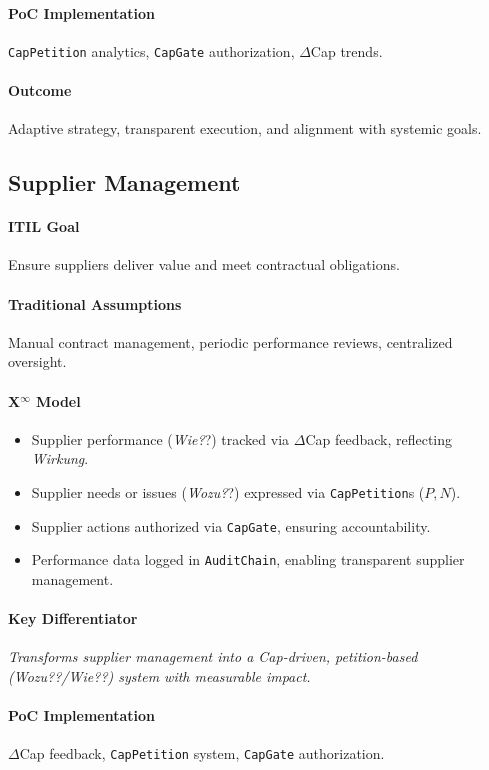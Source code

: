 \documentclass[12pt, a4paper]{scrartcl}
\newcommand{\Xinf}{X$^\infty$}                        %
\newcommand{\DeltaCap}{$\Delta$Cap}                    %
\newcommand{\Wirkung}{\textit{Wirkung}}                 %
\newcommand{\CapGate}{\texttt{CapGate}}
\newcommand{\AuditChain}{\texttt{AuditChain}}
\newcommand{\CapPetition}{\texttt{CapPetition}}        %
\newcommand{\Wozu}{\textit{Wozu?}}                      %
\newcommand{\Wie}{\textit{Wie?}}                        %
\begin{document}
\paragraph{PoC Implementation} \CapPetition{} analytics, \CapGate{} authorization, \DeltaCap{} trends.
\paragraph{Outcome} Adaptive strategy, transparent execution, and alignment with systemic goals.

\subsection{Supplier Management} %
\paragraph{ITIL Goal} Ensure suppliers deliver value and meet contractual obligations.
\paragraph{Traditional Assumptions} Manual contract management, periodic performance reviews, centralized oversight.
\paragraph*{\Xinf{} Model}
\begin{itemize}
    \item Supplier performance (\Wie?) tracked via \DeltaCap{} feedback, reflecting \Wirkung{}.
    \item Supplier needs or issues (\Wozu?) expressed via \CapPetition{}s ($P, N$).
    \item Supplier actions authorized via \CapGate{}, ensuring accountability.
    \item Performance data logged in \AuditChain{}, enabling transparent supplier management.
\end{itemize}
\paragraph{Key Differentiator} \textit{Transforms supplier management into a Cap-driven, petition-based (\Wozu?/\Wie?) system with measurable impact.}
\paragraph{PoC Implementation} \DeltaCap{} feedback, \CapPetition{} system, \CapGate{} authorization.
\end{document}

